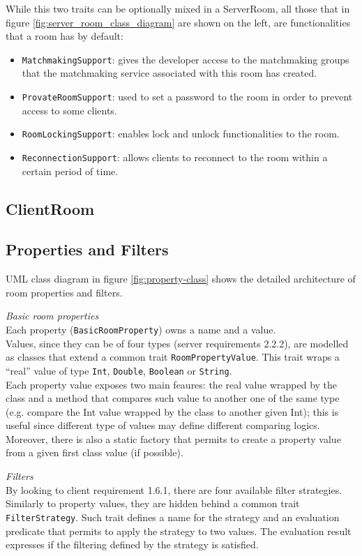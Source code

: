 While this two traits can be optionally mixed in a ServerRoom, all those that in figure \ref{fig:server_room_class_diagram} are shown on the left, are functionalities that a room has by default:
\begin{itemize}
	\item \texttt{MatchmakingSupport}: gives the developer access to the matchmaking groups that the matchmaking service associated with this room has created.
	\item \texttt{ProvateRoomSupport}: used to set a password to the room in order to prevent access to some clients.
	\item \texttt{RoomLockingSupport}: enables lock and unlock functionalities to the room. 
	\item \texttt{ReconnectionSupport}: allows clients to reconnect to the room within a certain period of time.
\end{itemize}

\subsection{ClientRoom}

\subsection{Properties and Filters}

UML class diagram in figure \ref{fig:property-class} shows the detailed architecture of room properties and filters. 

\bigskip
\textit{Basic room properties}
\\
Each property (\texttt{BasicRoomProperty}) owns a name and a value.
\\
Values, since they can be of four types (server requirements 2.2.2), are modelled as classes that extend a common trait \texttt{RoomPropertyValue}. This trait wraps a ``real'' value of type \texttt{Int}, \texttt{Double}, \texttt{Boolean} or \texttt{String}. 
\\
Each property value exposes two main feaures: the real value wrapped by the class and a method that compares such value to another one of the same type (e.g. compare the Int value wrapped by the class to another given Int); this is useful since different type of values may define different comparing logics.
Moreover, there is also a static factory that permits to create a property value from a given first class value (if possible).

\bigskip
\textit{Filters}
\\
By looking to client requirement 1.6.1, there are four available filter strategies. Similarly to property values, they are hidden behind a common trait \texttt{FilterStrategy}. Such trait defines a name for the strategy and an evaluation predicate that permits to apply the strategy to two values. The evaluation result expresses if the filtering defined by the strategy is satisfied.

